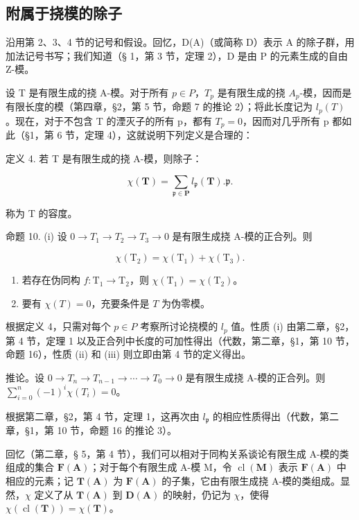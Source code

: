 \subsection{附属于挠模的除子}

沿用第 2、3、4 节的记号和假设。回忆，D(A)（或简称 D）表示 A 的除子群，用加法记号书写；我们知道（§ 1，第 3 节，定理 2），D 是由 P 的元素生成的自由 Z-模。

设 T 是有限生成的挠 A-模。对于所有 \(p \in P\)，\(T_{p}\) 是有限生成的挠 \(A_{p}\)-模，因而是有限长度的模（第四章，§2，第 5 节，命题 7 的推论 2）；将此长度记为 \(l_{p}(T)\)。现在，对于不包含 T 的湮灭子的所有 p，都有 \(T_{p} = 0\)，因而对几乎所有 p 都如此（§1，第 6 节，定理 4），这就说明下列定义是合理的：

定义 4. 若 T 是有限生成的挠 A-模，则除子：

\[
\chi (\mathbf {T}) = \sum_ {\mathfrak {p} \in \mathbf {P}} l _ {\mathfrak {p}} (\mathbf {T}). \mathfrak {p}.
\]

称为 T 的容度。

命题 10. (i) 设 \(0 \to T_1 \to T_2 \to T_3 \to 0\) 是有限生成挠 A-模的正合列。则

\[
\chi (\mathrm{T} _ {2}) = \chi (\mathrm{T} _ {1}) + \chi (\mathrm{T} _ {3}).
\]

\begin{enumerate}
\def\labelenumi{(\roman{enumi})}
\setcounter{enumi}{1}
\item
  若存在伪同构 \(f \colon \mathrm{T}_1 \to \mathrm{T}_2\)，则 \(\chi(\mathrm{T}_1) = \chi(\mathrm{T}_2)\)。
\item
  要有 \(\chi(T) = 0\)，充要条件是 \(T\) 为伪零模。
\end{enumerate}

根据定义 4，只需对每个 \(p \in P\) 考察所讨论挠模的 \(l_{p}\) 值。性质 (i) 由第二章，§2，第 4 节，定理 1 以及正合列中长度的可加性得出（代数，第二章，§1，第 10 节，命题 16），性质 (ii) 和 (iii) 则立即由第 4 节的定义得出。

推论。设 \(0 \to T_n \to T_{n-1} \to \cdots \to T_0 \to 0\) 是有限生成挠 A-模的正合列。则 \(\sum_{i=0}^{n} (-1)^i \chi(T_i) = 0\)。

根据第二章，§2，第 4 节，定理 1，这再次由 \(l_{\mathfrak{p}}\) 的相应性质得出（代数，第二章，§1，第 10 节，命题 16 的推论 3）。

回忆（第二章，§ 5，第 4 节），我们可以相对于同构关系谈论有限生成 A-模的类组成的集合 \(\mathbf{F}(\mathbf{A})\)；对于每个有限生成 A-模 M，令 \(\operatorname{cl}(\mathbf{M})\) 表示 \(\mathbf{F}(\mathbf{A})\) 中相应的元素；记 \(\mathbf{T}(\mathbf{A})\) 为 \(\mathbf{F}(\mathbf{A})\) 的子集，它由有限生成挠 A-模的类组成。显然，\(\chi\) 定义了从 \(\mathbf{T}(\mathbf{A})\) 到 \(\mathbf{D}(\mathbf{A})\) 的映射，仍记为 \(\chi\)，使得 \(\chi(\operatorname{cl}(\mathbf{T})) = \chi(\mathbf{T})\)。

